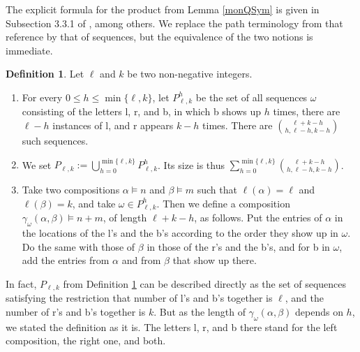 \documentclass{article}
\theoremstyle{definition}
\newtheorem{defn}[thm]{Definition}
\begin{document}
\medskip

The explicit formula for the product from Lemma \ref{monQSym} is given in Subsection 3.3.1 of \cite{[LMvW]}, among others. We replace the path terminology from that reference by that of sequences, but the equivalence of the two notions is immediate.
\begin{defn}
Let $\ell$ and $k$ be two non-negative integers.
\begin{enumerate}[$(i)$]
\item For every $0 \leq h\leq\min\{\ell,k\}$, let $P_{\ell,k}^{h}$ be the set of all sequences $\omega$ consisting of the letters l, r, and b, in which b shows up $h$ times, there are $\ell-h$ instances of l, and r appears $k-h$ times. There are $\binom{\ell+k-h}{h,\ell-h,k-h}$ such sequences.
\item We set $P_{\ell,k}:=\bigcup_{h=0}^{\min\{\ell,k\}}P_{\ell,k}^{h}$. Its size is thus $\sum_{h=0}^{\min\{\ell,k\}}\binom{\ell+k-h}{h,\ell-h,k-h}$.
\item Take two compositions $\alpha \vDash n$ and $\beta \vDash m$ such that $\ell(\alpha)=\ell$ and $\ell(\beta)=k$, and take $\omega \in P_{\ell,k}^{h}$. Then we define a composition $\gamma_{\omega}(\alpha,\beta) \vDash n+m$, of length $\ell+k-h$, as follows. Put the entries of $\alpha$ in the locations of the l's and the b's according to the order they show up in $\omega$. Do the same with those of $\beta$ in those of the r's and the b's, and for b in $\omega$, add the entries from $\alpha$ and from $\beta$ that show up there.
\end{enumerate} \label{pathsmult}
\end{defn}
In fact, $P_{\ell,k}$ from Definition \ref{pathsmult} can be described directly as the set of sequences satisfying the restriction that number of l's and b's together is $\ell$, and the number of r's and b's together is $k$. But as the length of $\gamma_{\omega}(\alpha,\beta)$ depends on $h$, we stated the definition as it is. The letters l, r, and b there stand for the left composition, the right one, and both.
\end{document}
